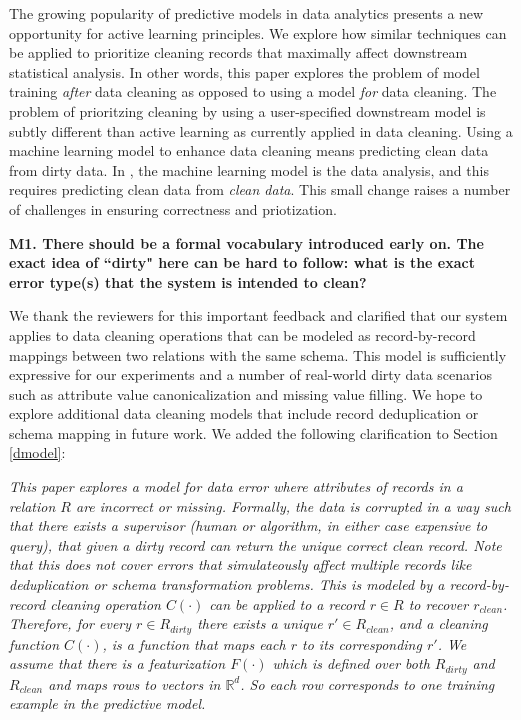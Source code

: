 The growing popularity of predictive models in data analytics \cite{bdas, alexandrov2014stratosphere, crotty2014tupleware, hellerstein2012madlib} presents a new opportunity for active learning principles.
We explore how similar techniques can be applied to prioritize cleaning records that maximally affect downstream statistical analysis.
In other words, this paper explores the problem of model training \emph{after} data cleaning as opposed to using a model \emph{for} data cleaning.
The problem of prioritzing cleaning by using a user-specified downstream model is subtly different than active learning as currently applied in data cleaning.
Using a machine learning model to enhance data cleaning means predicting clean data from dirty data.
In \sys, the machine learning model is the data analysis, and this requires predicting clean data from \emph{clean data}.
This small change raises a number of challenges in ensuring correctness and priotization.


\vspace{0.5em}

\noindent\noindent \textbf{M1. There should be a formal vocabulary introduced early on. The exact idea of ``dirty" here can be hard to follow: what is the exact error type(s) that the system is intended to clean?}

\vspace{0.5em}

We thank the reviewers for this important feedback and clarified that our system applies to data cleaning operations that can be modeled as record-by-record mappings between two relations with the same schema.
This model is sufficiently expressive for our experiments and a number of real-world dirty data scenarios such as attribute value canonicalization and missing value filling.
We hope to explore additional data cleaning models that include record deduplication or schema mapping in future work.
We added the following clarification to Section \ref{dmodel}:

\emph{This paper explores a model for data error where attributes of records in a relation $R$ are incorrect or missing.
Formally, the data is corrupted in a way such that there exists a supervisor (human or algorithm, in either case expensive to query), that given a dirty record can return the unique correct clean record.
Note that this does not cover errors that simulateously affect multiple records like deduplication or schema transformation problems.
This is modeled by a record-by-record cleaning operation $C(\cdot)$ can be applied to a record $r \in R$ to recover $r_{clean}$.
Therefore, for every $r \in R_{dirty}$ there exists a unique $r' \in R_{clean}$, and a cleaning function $C(\cdot)$, is a function that maps each $r$ to its corresponding $r'$.
We assume that there is a featurization $F(\cdot)$ which is defined over both $R_{dirty}$ and $R_{clean}$ and maps rows to vectors in $\mathbb{R}^d$.
So each row corresponds to one training example in the predictive model.}


